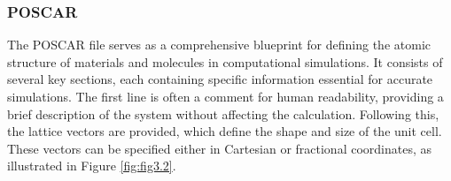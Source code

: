 \subsubsection{POSCAR}
The POSCAR file serves as a comprehensive blueprint for defining the atomic structure of materials and molecules in computational simulations. It consists of several key sections, each containing specific information essential for accurate simulations. The first line is often a comment for human readability, providing a brief description of the system without affecting the calculation. Following this, the lattice vectors are provided, which define the shape and size of the unit cell. These vectors can be specified either in Cartesian or fractional coordinates, as illustrated in Figure \ref{fig:fig3.2}.
\begin{figure}[H]
\end{figure}

